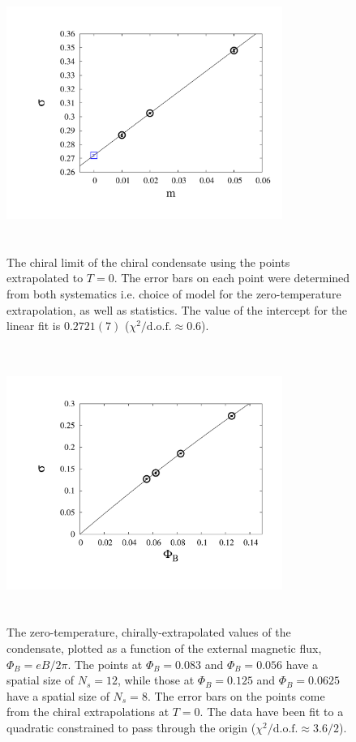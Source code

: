 \documentclass[aps,prd,twocolumn,showpacs,superscriptaddress,groupedaddress]{revtex4}  %
\begin{document}
\begin{figure}
\vspace{-1.2cm}
  \includegraphics[height=9cm,width=9cm]{pbp_vs_m_PHI0125_zeroT_lin_graphene_paper_new.pdf} 
  \vspace{-1.25cm}
\caption{The chiral limit of the chiral condensate using the points extrapolated to $T=0$. The error bars on each point were determined from both systematics i.e. choice of model for the zero-temperature extrapolation, as well as statistics. The value of the intercept for the linear fit is $0.2721(7)$ ($\chi^2/\text{d.o.f.} \approx 0.6$).}
\label{PBPzeroTChiral}
\end{figure}

\begin{figure}
\vspace{-1.2cm}
 \includegraphics[height=9cm,width=9cm]{pbp_vs_PHI_graphene_paper_new.pdf} 
 \vspace{-1.25cm}
\caption{The zero-temperature, chirally-extrapolated values of the condensate, plotted as a function of the external magnetic flux,  $\Phi_B = eB/2\pi$.  The points at $\Phi_B=0.083$ and $\Phi_B=0.056$ have a spatial size of $N_s=12$, while those at $\Phi_B=0.125$ and $\Phi_B=0.0625$ have a spatial size of $N_s=8$. The error bars on the points come from the chiral extrapolations at $T=0$. The data have been fit to a quadratic constrained to pass through the origin ($\chi^2/\text{d.o.f.} \approx 3.6/2$). } 
\label{PBPzeroTChiralvseB}
\end{figure}
\end{document}
